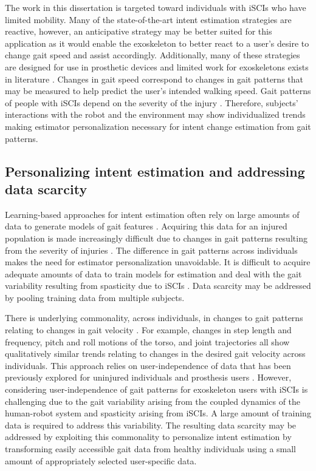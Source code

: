 The work in this dissertation is targeted toward individuals with iSCIs who have limited mobility. Many of the state-of-the-art intent estimation strategies are reactive, however, an anticipative strategy may be better suited for this application as it would enable the exoskeleton to better react to a user's desire to change gait speed and assist accordingly. Additionally, many of these strategies are designed for use in prosthetic devices \cite{young2013classifying,young2015classification,massalin2017user,thatte2019robust} and limited work for exoskeletons exists in literature \cite{medrano2022analysis}. Changes in gait speed correspond to changes in gait patterns that may be measured to help predict the user's intended walking speed. Gait patterns of people with \mbox{iSCIs} depend on the severity of the injury \cite{rota2011walk}. Therefore, subjects' interactions with the robot and the environment may show individualized trends making estimator personalization necessary for intent change estimation from gait patterns. 

\subsection{Personalizing intent estimation and addressing data scarcity}\label{sec:personalization}

Learning-based approaches for intent estimation often rely on large amounts of data to generate models of gait features \cite{lee2020image,moolchandani2021design}. Acquiring this data for an injured population is made increasingly difficult due to changes in gait patterns resulting from the severity of injuries \cite{sohn2018variability}. The difference in gait patterns across individuals makes the need for estimator personalization unavoidable. It is difficult to acquire adequate amounts of data to train models for estimation and deal with the gait variability resulting from spasticity due to iSCIs \cite{krawetz1996gait}. Data scarcity may be addressed by pooling training data from multiple subjects.

There is underlying commonality, across individuals, in changes to gait patterns relating to changes in gait velocity \cite{li1999coordination}. For example, changes in step length and frequency, pitch and roll motions of the torso, and joint trajectories all show qualitatively similar trends relating to changes in the desired gait velocity across individuals. This approach relies on user-independence of data that has been previously explored for uninjured individuals \cite{ibrahim2008gait, kilmartin2009optimising, wang2008accelerometry} and prosthesis users \cite{young2015classification}. However, considering user-independence of gait patterns for exoskeleton users with iSCIs is challenging due to the gait variability arising from the coupled dynamics of the human-robot system and spasticity arising from \mbox{iSCIs}. A large amount of training data is required to address this variability. The resulting data scarcity may be addressed by exploiting this commonality to personalize intent estimation by transforming easily accessible gait data from healthy individuals using a small amount of appropriately selected user-specific data.

